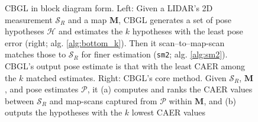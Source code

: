 \begin{figure}\vspace{-0.4cm}
  \hspace{-0.5cm}
  \subfloat{\label{fig:cbgl}     }
  \hspace{-0.99cm}
  \subfloat{\label{fig:bottom_k} }
  \caption{\small CBGL in block diagram form. Left: Given a LIDAR's 2D
           measurement $\mathcal{S}_R$ and a map $\bm{M}$, CBGL generates a set
           of pose hypotheses $\mathcal{H}$ and estimates the $k$ hypotheses
           with the least pose error (right; alg. \ref{alg:bottom_k}). Then it
           scan--to--map-scan matches those to $\mathcal{S}_R$ for finer
           estimation (\texttt{sm2}; alg. \ref{alg:sm2}). CBGL's output pose
           estimate is that with the least CAER among the $k$ matched
           estimates.  Right: CBGL's core method. Given $\mathcal{S}_R$,
           $\bm{M}$, and pose estimates $\mathcal{P}$, it (a) computes and
           ranks the CAER values between $\mathcal{S}_R$ and map-scans captured
           from $\mathcal{P}$ within $\bm{M}$, and (b) outputs the hypotheses
           with the $k$ lowest CAER values}
\vspace{-0.5cm}
  \label{fig:block_system}
\end{figure}


